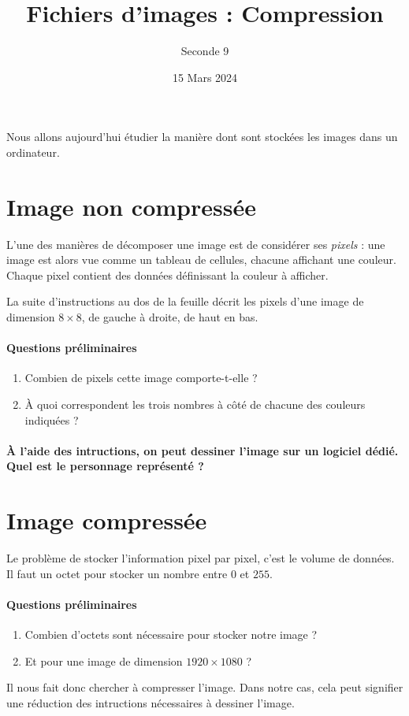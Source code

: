 \documentclass{article}
\title{Fichiers d'images : Compression}
\date{15 Mars 2024}
\author{Seconde 9}
\begin{document}
\maketitle
\thispagestyle{empty}
\pagestyle{empty}
Nous allons aujourd'hui étudier la manière dont sont stockées les images dans un ordinateur.

\section{Image non compressée}
L'une des manières de décomposer une image est de considérer ses \emph{pixels} : une image est alors vue comme un tableau de cellules, chacune affichant une couleur. Chaque pixel contient des données définissant la couleur à afficher.

La suite d'instructions au dos de la feuille décrit les pixels d'une image de dimension $8 \times 8$, de gauche à droite, de haut en bas.

\paragraph{Questions préliminaires}
\begin{enumerate}[label=\emph{\alph*)}]
\item Combien de pixels cette image comporte-t-elle ?
\item À quoi correspondent les trois nombres à côté de chacune des couleurs indiquées ? 
\end{enumerate}

\paragraph{À l'aide des intructions, on peut dessiner l'image sur un logiciel dédié. Quel est le personnage représenté ?}
\section{Image compressée}
Le problème de stocker l'information \og pixel par pixel\fg, c'est le volume de données. Il faut un octet pour stocker un nombre entre $0$ et $255$.
\paragraph{Questions préliminaires}
\begin{enumerate}[label=\emph{\alph*)}]
\item Combien d'octets sont nécessaire pour stocker notre image ?
\item Et pour une image de dimension $1920 \times 1080$ ?
\end{enumerate}
Il nous fait donc chercher à compresser l'image. Dans notre cas, cela peut signifier une réduction des intructions nécessaires à dessiner l'image.
\end{document}
